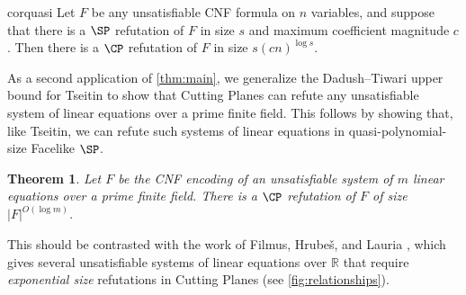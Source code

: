 \documentclass[11pt]{article}
\numberwithin{equation}{section}
\newtheorem{theorem}{Theorem}[section]
\theoremstyle{definition}
\theoremstyle{plain}
\newcounter{cor}\renewcommand{\thecor}{1.1.\arabic{cor}}\newenvironment{cor}{\ifnum\value{cor}=0\refstepcounter{cor}\else\PackageError{toc-native-compat}{Unsupported additional cor envelope}{Only the one exact source-observed cor paragraph is allowed.}\fi}{}\providecommand{\corautorefname}{Theorem}
\newcommand{\reals}{\ensuremath{\mathbb{R}}}
\begin{document}
\begin{restatable}{cor}{quasi}
	\label{cor:quasipoly-simulation}
	Let $F$ be any unsatisfiable CNF formula on $n$ variables, and suppose that there is a $\SP$ refutation of $F$ in size $s$ and maximum coefficient magnitude $c$. 
	Then there is a $\CP$ refutation of $F$ in size $s(cn)^{\log s}$.
\end{restatable}


As a second application of \autoref{thm:main}, we generalize %
the Dadush--Tiwari  %
%
upper bound for Tseitin to show that Cutting Planes can refute any unsatisfiable system of linear equations over a prime finite field. 
This follows by showing that, like Tseitin, we can refute such systems of linear equations in quasi-polynomial-size Facelike $\SP$.
\begin{theorem}\label{thm:linear-equations}
	Let $F$ be the CNF encoding of an unsatisfiable system of $m$ linear equations over a prime finite field. 
	There is a $\CP$ refutation of $F$ of size $|F|^{O(\log m)}$. 
\end{theorem}

This should be contrasted with the work of Filmus, Hrube\v{s}, and Lauria \cite{FilmusHL16}, which gives several unsatisfiable systems of linear equations over $\reals$ that require \emph{exponential size} refutations in Cutting Planes (see \autoref{fig:relationships}).
\end{document}
